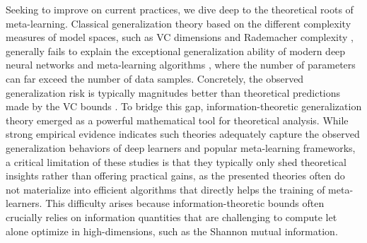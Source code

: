 \documentclass[nohyperref]{article}
\theoremstyle{plain}
\theoremstyle{definition}
\theoremstyle{remark}
\begin{document}
Seeking to improve on current practices, we dive deep to the theoretical roots of meta-learning. Classical generalization theory based on the different complexity measures of model spaces, such as VC dimensions and Rademacher complexity \citep{vapnik1999nature}, generally fails to explain the exceptional generalization ability of modern deep neural networks and meta-learning algorithms \citep{zhang2017understanding}, where the number of parameters can far exceed the number of data samples. Concretely, the observed generalization risk is typically magnitudes better than theoretical predictions made by the VC bounds \citep{}. To bridge this gap, information-theoretic generalization theory emerged as a powerful mathematical tool for theoretical analysis. While strong empirical evidence indicates such theories adequately capture the observed generalization behaviors of deep learners and popular meta-learning frameworks, a critical limitation of these studies is that they typically only shed theoretical insights rather than offering practical gains, as the presented theories often do not materialize into efficient algorithms that directly helps the training of meta-learners. This difficulty arises because information-theoretic bounds often crucially relies on information quantities that are challenging to compute let alone optimize in high-dimensions, such as the Shannon mutual information. 




\end{document}
